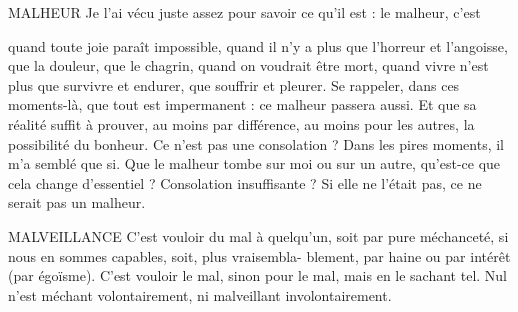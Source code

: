 MALHEUR Je l'ai vécu juste assez pour savoir ce qu’il est : le malheur, c’est

quand toute joie paraît impossible, quand il n’y a plus que
l'horreur et l'angoisse, que la douleur, que le chagrin, quand on voudrait être
mort, quand vivre n’est plus que survivre et endurer, que souffrir et pleurer.
Se rappeler, dans ces moments-là, que tout est impermanent : ce malheur passera
aussi. Et que sa réalité suffit à prouver, au moins par différence, au moins
pour les autres, la possibilité du bonheur. Ce n’est pas une consolation ? Dans
les pires moments, il m’a semblé que si. Que le malheur tombe sur moi ou sur
un autre, qu'est-ce que cela change d’essentiel ? Consolation insuffisante ? Si
elle ne l'était pas, ce ne serait pas un malheur.

MALVEILLANCE C'est vouloir du mal à quelqu'un, soit par pure méchanceté,
si nous en sommes capables, soit, plus vraisembla-
blement, par haine ou par intérêt (par égoïsme). C’est vouloir le mal, sinon
pour le mal, mais en le sachant tel. Nul n’est méchant volontairement, ni malveillant
involontairement.

